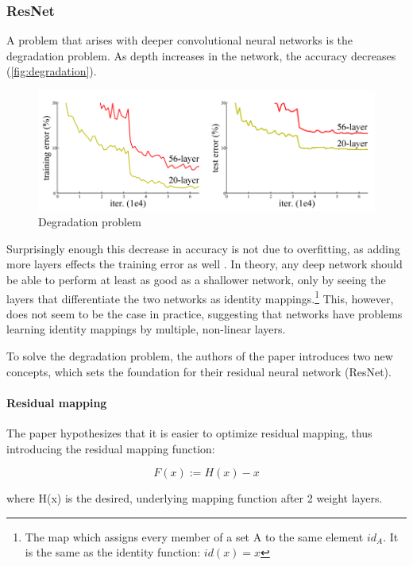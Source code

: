 \subsubsection{ResNet}
A problem that arises with deeper convolutional neural networks is the degradation problem. As depth increases in the network, the accuracy decreases (\autoref{fig:degradation}).

\begin{figure}[!h]
	\centering
	\includegraphics[scale=0.5]{fig/degradation.png}
	\caption{Degradation problem \citep{Wu2017}}
	\label{fig:degradation}
\end{figure}

Surprisingly enough this decrease in accuracy is not due to overfitting, as adding more layers effects the training error as well \citep{Wu2017}. In theory, any deep network should be able to perform at least as good as a shallower network, only by seeing the layers that differentiate the two networks as identity mappings.\footnote{The map which assigns every member of a set A to the same element  $id_{A}$. It is the same as the identity function: $id(x)=x$} This, however, does not seem to be the case in practice, suggesting that networks have problems learning identity mappings by multiple, non-linear layers.

To solve the degradation problem, the authors of the paper introduces two new concepts, which sets the foundation for their residual neural network (ResNet).

\paragraph{Residual mapping}
The paper hypothesizes that it is easier to optimize residual mapping, thus introducing the residual mapping function:

\begin{equation}
	F(x) := H(x) - x
\end{equation}

where H(x) is the desired, underlying mapping function after 2 weight layers.

